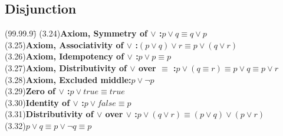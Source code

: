 \documentclass{amsart}
\newcommand{\lgap}{2pt}                             %
\begin{document}
\subsection*{Disjunction}
\begin{tabbing}
(99.99.9)\;\=\kill
(3.24)\>\textbf{Axiom, Symmetry of $\lor$ :}\quad $p\lor q \equiv q\lor p$\\[\lgap]
(3.25)\>\textbf{Axiom, Associativity of $\lor$ :}\quad $(p\lor q) \lor r\equiv p\lor (q\lor r)$\\[\lgap]
(3.26)\>\textbf{Axiom, Idempotency of $\lor$ :}\quad $p\lor p \equiv p$\\[\lgap]
(3.27)\>\textbf{Axiom, Distributivity of $\lor$ over $\equiv$ :}\quad $p\lor (q\equiv r)\equiv p\lor q\equiv p\lor r$\\[\lgap]
(3.28)\>\textbf{Axiom, Excluded middle:}\quad $p\lor\neg p$\\[\lgap]
(3.29)\>\textbf{Zero of $\lor$ :}\quad $p\lor true\equiv true$\\[\lgap]
(3.30)\>\textbf{Identity of $\lor$ :}\quad $p\lor false\equiv p$\\[\lgap]
(3.31)\>\textbf{Distributivity of $\lor$ over $\lor$ :}\quad $p\lor (q\lor r)\equiv (p\lor q)\lor (p\lor r)$\\[\lgap]
(3.32)\>$p\lor q\equiv p\lor\neg q\equiv p$\\
\end{tabbing}

\end{document}
